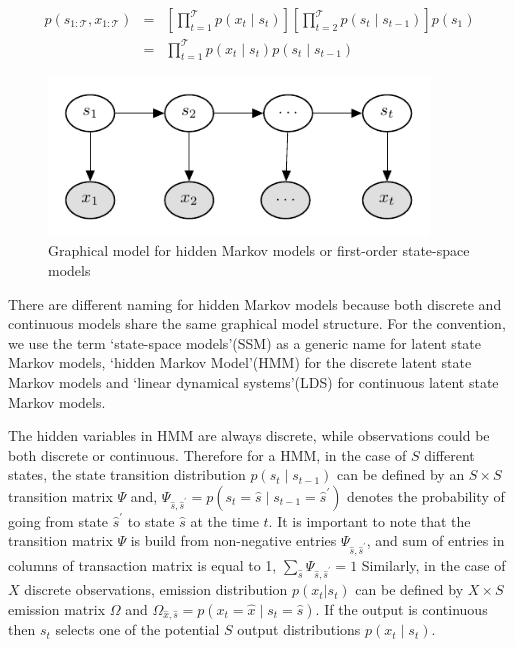 \begin{eqnarray}
    p\left(s_{1 : \mathcal{T}}, x_{1 : \mathcal{T}}\right) & = & \left[\prod_{t=1}^{\mathcal{T}} p\left(x_{t} \mid s_{t}\right)\right]\left[\prod_{t=2}^{\mathcal{T}} p\left(s_{t} \mid s_{t-1}\right)\right]p\left(s_{1}\right) \\
    & = & \prod_{t=1}^{\mathcal{T}} p\left(x_{t} \mid s_{t}\right)p\left(s_{t} \mid s_{t-1}\right)\label{eq:hmm}
\end{eqnarray}

\begin{figure}
    \centering
    \includegraphics[width=0.9\textwidth]{figures/hmm.pdf}
    \caption{Graphical model for hidden Markov models or first-order state-space models}
    \label{fig:hmm}
\end{figure}

There are different naming for hidden Markov models because both discrete and continuous models share the same graphical model structure. 
For the convention, we use the term `state-space models'(SSM) as a generic name for latent state Markov models, `hidden Markov Model'(HMM) for the discrete latent state Markov models and `linear dynamical systems'(LDS) for continuous latent state Markov models.

The hidden variables in HMM are always discrete, while observations could be both discrete or continuous.
Therefore for a HMM, in the case of $S$ different states, the state transition distribution $p(s_{t}\mid s_{t-1})$ can be defined by an $S \times S$ transition matrix {\boldmath$\Psi$} and, $\Psi_{\hat{s}, \hat{s}^{\prime}}=p\left(s_{t}=\hat{s} \mid s_{t-1}=\hat{s}^{\prime}\right)$ denotes the probability of going from state $\hat{s}^{\prime}$ to state $\hat{s}$ at the time $t$. 
It is important to note that the transition matrix {\boldmath$\Psi$} is build from non-negative entries $\Psi_{\hat{s}, \hat{s}^{\prime}}$, and sum of entries in columns of transaction matrix is equal to 1, $\sum_{\hat{s}} \Psi_{\hat{s}, \hat{s}^{\prime}} = 1$
Similarly, in the case of $X$ discrete observations, emission distribution $p(x_t | s_t)$ can be defined  by $ X \times S$ emission matrix {\boldmath$\Omega$} and $\Omega_{\hat{x}, \hat{s}} = p\left(x_t = \hat{x} \mid s_t = \hat{s} \right)$. If the output is continuous then $s_t$ selects one of the potential $S$ output distributions $p(x_t \mid s_t)$.

